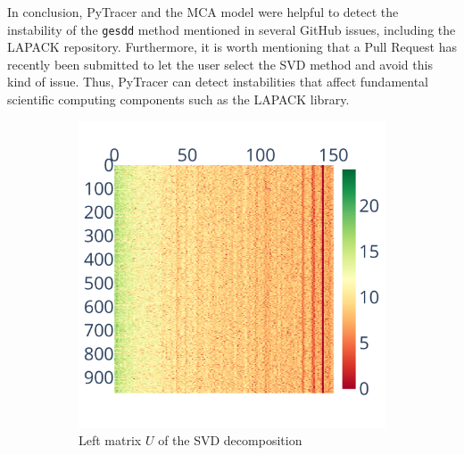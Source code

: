 \documentclass[10pt,journal,compsoc]{IEEEtran}
\newcommand{\pytracer}[0]{PyTracer\xspace}
\begin{document}
In conclusion, \pytracer and the MCA model were helpful to detect the
instability of the \texttt{gesdd} method mentioned in several GitHub issues,
including the LAPACK repository. Furthermore, it is worth mentioning that a Pull
Request has recently been submitted to let the user select the SVD method and
avoid this kind of issue. Thus, \pytracer can detect instabilities that affect
fundamental scientific computing components such as the LAPACK library.



\begin{figure}
    \centering
    \begin{subfigure}{0.3\linewidth}
        \includegraphics[width=\linewidth]{figure/face_recognition/randomized_svd_ret_U_sig.pdf}
        \caption{Left matrix $U$ of the SVD decomposition}
        \label{fig:randomized_svd_U}
    \end{subfigure}
    \begin{subfigure}{0.3\linewidth}

\end{subfigure}
\end{figure}
\end{document}
